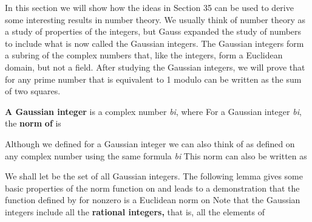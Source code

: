 \documentclass[11pt,oneside]{article}
\begin{document}
\fi
\renewcommand{\BookFooter}{Section 36 Number Theory}
\ifdefined\BookMaster\else\setcounter{page}{292}\fi
\BookNarrativetrue

\begin{BookBody}


\noindent In this section we will show how the ideas in Section 35 can be used to derive some interesting results in number theory. We usually think of number theory as a study of properties of the integers, but Gauss expanded the study of numbers to include what is now called the Gaussian integers. The Gaussian integers form a subring of the complex numbers that, like the integers, form a Euclidean domain, but not a field. After studying the Gaussian integers, we will prove that for any prime number  that is equivalent to 1 modulo  can be written as the sum of two squares.


 \textbf{A Gaussian integer} is a complex number  \textit{bi}, where  For a Gaussian integer  \textit{bi}, the\textbf{ norm}  \textbf{of} \BookInline{\alpha } is \BookEnd{\blacksquare}

Although we defined  for a Gaussian integer \BookInline{\alpha,\allowbreak } we can also think of  as defined on any complex number using the same formula  \textit{bi} This norm can also be written as 

We shall let  be the set of all Gaussian integers. The following lemma gives some basic properties of the norm function  on  and leads to a demonstration that the function \BookInline{\nu } defined by  for nonzero  is a Euclidean norm on  Note that the Gaussian integers include all the\textbf{ rational integers,} that is, all the elements of 

 \BookEnd{\blacksquare}


\end{BookBody}
\end{document}
